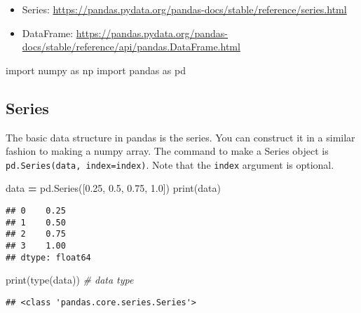 \documentclass[
]{book}
\newenvironment{Shaded}{\begin{snugshade}}{\end{snugshade}}
\newcommand{\BuiltInTok}[1]{#1}
\newcommand{\CommentTok}[1]{\textcolor[rgb]{0.56,0.35,0.01}{\textit{#1}}}
\newcommand{\FloatTok}[1]{\textcolor[rgb]{0.00,0.00,0.81}{#1}}
\newcommand{\ImportTok}[1]{#1}
\newcommand{\NormalTok}[1]{#1}
\newcommand{\OperatorTok}[1]{\textcolor[rgb]{0.81,0.36,0.00}{\textbf{#1}}}
\begin{document}
\begin{itemize}
\item
  Series: \url{https://pandas.pydata.org/pandas-docs/stable/reference/series.html}
\item
  DataFrame: \url{https://pandas.pydata.org/pandas-docs/stable/reference/api/pandas.DataFrame.html}
\end{itemize}

\begin{Shaded}
\begin{Highlighting}[]
\ImportTok{import}\NormalTok{ numpy }\ImportTok{as}\NormalTok{ np}
\ImportTok{import}\NormalTok{ pandas }\ImportTok{as}\NormalTok{ pd}
\end{Highlighting}
\end{Shaded}

\hypertarget{series}{%
\subsection{Series}\label{series}}

The basic data structure in pandas is the series. You can construct it in a similar fashion to making a numpy array. The command to make a Series object is
\texttt{pd.Series(data,\ index=index)}. Note that the \texttt{index} argument is optional.

\begin{Shaded}
\begin{Highlighting}[]
\NormalTok{data }\OperatorTok{=}\NormalTok{ pd.Series([}\FloatTok{0.25}\NormalTok{, }\FloatTok{0.5}\NormalTok{, }\FloatTok{0.75}\NormalTok{, }\FloatTok{1.0}\NormalTok{])}
\BuiltInTok{print}\NormalTok{(data)}
\end{Highlighting}
\end{Shaded}

\begin{verbatim}
## 0    0.25
## 1    0.50
## 2    0.75
## 3    1.00
## dtype: float64
\end{verbatim}

\begin{Shaded}
\begin{Highlighting}[]
\BuiltInTok{print}\NormalTok{(}\BuiltInTok{type}\NormalTok{(data)) }\CommentTok{\# data type}
\end{Highlighting}
\end{Shaded}

\begin{verbatim}
## <class 'pandas.core.series.Series'>
\end{verbatim}
\end{document}
